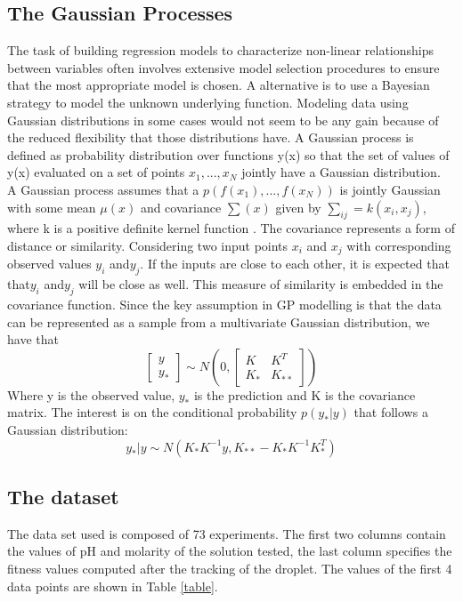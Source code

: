 \documentclass[a4paper]{article}
\begin{document}
\subsection{The Gaussian Processes}
The task of building regression models to characterize non-linear relationships between variables often involves extensive model selection procedures to ensure that the most appropriate model is chosen.
A alternative is to use a Bayesian strategy to model the unknown underlying function.
Modeling data using Gaussian distributions in some cases would not seem to be any gain because of the reduced flexibility that those distributions have. 
A Gaussian process is defined as probability distribution over functions y(x) so that the set of values of y(x) evaluated on a set of points ${ x }_{ 1 },...,{ x }_{ N }$ jointly have a Gaussian distribution.
\\A Gaussian process assumes that a $p(f({ x }_{ 1 }),...,f({ x }_{ N }))$ is jointly Gaussian with some mean $\mu(x)$ and covariance $ \sum { (x) } $ given by $\sum _{ ij }^{  }{ =k({ x }_{ i },{ x }_{ j }) } $, where k is a positive definite kernel function \cite{gp_process}.
The covariance represents a form of distance or similarity. Considering two input points ${x}_{i}$ and ${x}_{j}$ with corresponding observed values ${y}_{i}$ and${y}_{j}$. If the inputs are close to each other, it is expected that that${y}_{i}$ and${y}_{j}$ will be close as well. This measure of similarity is embedded in the covariance function.
Since the key assumption in GP modelling is that the data can be represented as a sample from a multivariate Gaussian distribution, we have that
\begin{equation}
\begin{bmatrix} y \\ { y }_{ * } \end{bmatrix}\sim N \left( 0,\begin{bmatrix} K & { K }^{ T } \\ { K }_{ * } & { K }_{ ** } \end{bmatrix} \right)
\end{equation}
Where y is the observed value, ${y}_{*}$ is the prediction and K is the covariance matrix. The interest is on the conditional probability $p({y}_{*}|y)$ that follows a Gaussian distribution:
\begin{equation}
{ y }_{ * }|y\sim N({ K }_{ * }{ K }^{ -1 }y,{ K }_{ ** }-{ K }_{ * }{ K }^{ -1 }{ K }_{ * }^{ T })
\end{equation}
\newpage
\subsection{The dataset}
The data set used is composed of 73 experiments. The first two columns contain the values of pH and molarity of the solution tested, the last column specifies the fitness values computed after the tracking of the droplet. 
The values of the first 4 data points are shown in Table \ref{table}.
\end{document}

